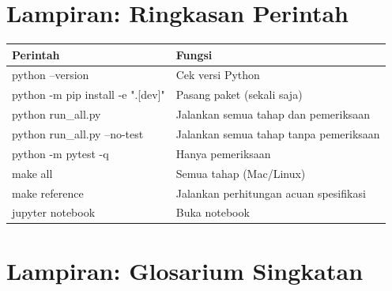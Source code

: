 \documentclass[11pt,a4paper]{article}
\begin{document}
\section{Lampiran: Ringkasan Perintah}

\begin{center}
\begin{tabularx}{\linewidth}{>{\ttfamily\small\raggedright\arraybackslash}p{6.6cm}X}
\toprule
\textrm{\textbf{Perintah}} & \textbf{Fungsi} \\
\midrule
python --version & Cek versi Python \\
python -m pip install -e ".[dev]" & Pasang paket (sekali saja) \\
python run\_\allowbreak{}all.py & Jalankan semua tahap dan pemeriksaan \\
python run\_\allowbreak{}all.py --no-test & Jalankan semua tahap tanpa pemeriksaan \\
python -m pytest -q & Hanya pemeriksaan \\
make all & Semua tahap (Mac/Linux) \\
make reference & Jalankan perhitungan acuan spesifikasi \\
jupyter notebook & Buka notebook \\
\bottomrule
\end{tabularx}
\end{center}

\section{Lampiran: Glosarium Singkatan}
\end{document}
